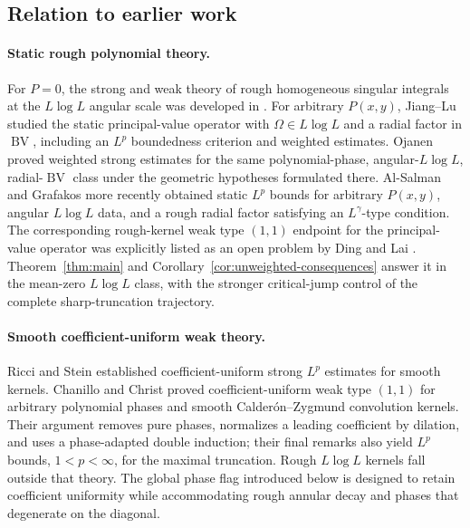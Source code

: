 \documentclass[11pt]{article}
\numberwithin{equation}{section}
\theoremstyle{remark}
\theoremstyle{definition}
\newcommand{\BV}{\operatorname{BV}}
\begin{document}
\subsection{Relation to earlier work}\label{intro:literature}

\paragraph{Static rough polynomial theory.}
For $P=0$, the strong and weak theory of rough homogeneous singular
integrals at the $L\log L$ angular scale was developed in
\cite{CZ56,DRdF86,CRdF88,Seeger96}.  For arbitrary $P(x,y)$,
Jiang--Lu \cite{JiangLu} studied the static principal-value operator with
$\Omega\in L\log L$ and a radial factor in $\BV$, including an $L^p$
boundedness criterion and weighted estimates.  Ojanen \cite{Ojanen}
proved weighted strong estimates for the same polynomial-phase,
angular-$L\log L$, radial-$\BV$ class under the geometric hypotheses
formulated there.  Al-Salman and Grafakos \cite{AlSalmanGrafakos} more
recently obtained static $L^p$ bounds for arbitrary $P(x,y)$, angular
$L\log L$ data, and a rough radial factor satisfying an
$L^\gamma$-type condition.  The corresponding rough-kernel weak type
$(1,1)$ endpoint for the principal-value operator was explicitly listed
as an open problem by Ding and Lai \cite[\S6.1]{DingLai}.
Theorem~\ref{thm:main} and
Corollary~\ref{cor:unweighted-consequences} answer it in the mean-zero
$L\log L$ class, with the stronger critical-jump control of the complete
sharp-truncation trajectory.

\paragraph{Smooth coefficient-uniform weak theory.}
Ricci and Stein \cite{RicciStein} established coefficient-uniform strong
$L^p$ estimates for smooth kernels.  Chanillo and Christ
\cite{ChanilloChrist} proved coefficient-uniform weak type $(1,1)$ for
arbitrary polynomial phases and smooth Calder\'on--Zygmund convolution
kernels.  Their argument removes pure phases, normalizes a leading
coefficient by dilation, and uses a phase-adapted double induction; their
final remarks also yield $L^p$ bounds, $1<p<\infty$, for the maximal
truncation.  Rough $L\log L$ kernels fall outside that theory.  The global
phase flag introduced below is designed to retain coefficient uniformity
while accommodating rough annular decay and phases that degenerate on the
diagonal.
\end{document}
